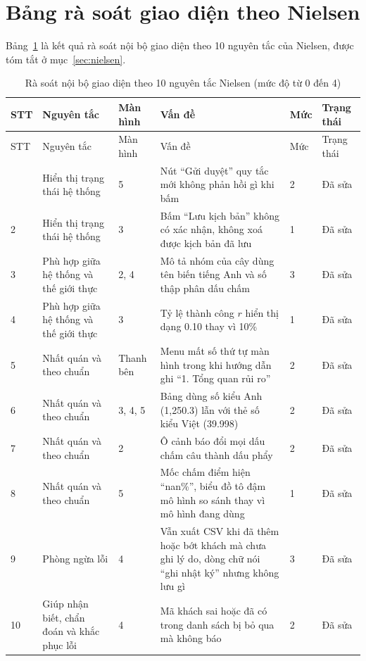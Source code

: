 \section{Bảng rà soát giao diện theo Nielsen}\label{sec:pl_nielsen}
Bảng~\ref{tab:nielsen} là kết quả rà soát nội bộ giao diện theo 10 nguyên tắc của Nielsen, được tóm tắt ở mục~\ref{sec:nielsen}.

{\footnotesize
\begin{longtable}{p{0.6cm}p{3.3cm}p{1.4cm}p{6.2cm}p{0.8cm}p{1.5cm}}
\caption{Rà soát nội bộ giao diện theo 10 nguyên tắc Nielsen (mức độ từ 0 đến 4)}\label{tab:nielsen}\\
\toprule
STT & Nguyên tắc & Màn hình & Vấn đề & Mức & Trạng thái \\
\midrule
\endfirsthead
\toprule
STT & Nguyên tắc & Màn hình & Vấn đề & Mức & Trạng thái \\
\midrule
\endhead
\bottomrule
\endlastfoot
1 & Hiển thị trạng thái hệ thống & 5 & Nút ``Gửi duyệt'' quy tắc mới không phản hồi gì khi bấm & 2 & Đã sửa \\
2 & Hiển thị trạng thái hệ thống & 3 & Bấm ``Lưu kịch bản'' không có xác nhận, không xoá được kịch bản đã lưu & 1 & Đã sửa \\
3 & Phù hợp giữa hệ thống và thế giới thực & 2, 4 & Mô tả nhóm của cây dùng tên biến tiếng Anh và số thập phân dấu chấm & 3 & Đã sửa \\
4 & Phù hợp giữa hệ thống và thế giới thực & 3 & Tỷ lệ thành công $r$ hiển thị dạng 0.10 thay vì 10\% & 1 & Đã sửa \\
5 & Nhất quán và theo chuẩn & Thanh bên & Menu mất số thứ tự màn hình trong khi hướng dẫn ghi ``1. Tổng quan rủi ro'' & 2 & Đã sửa \\
6 & Nhất quán và theo chuẩn & 3, 4, 5 & Bảng dùng số kiểu Anh (1,250.3) lẫn với thẻ số kiểu Việt (39.998) & 2 & Đã sửa \\
7 & Nhất quán và theo chuẩn & 2 & Ô cảnh báo đổi mọi dấu chấm câu thành dấu phẩy & 2 & Đã sửa \\
8 & Nhất quán và theo chuẩn & 5 & Mốc chấm điểm hiện ``nan\%'', biểu đồ tô đậm mô hình so sánh thay vì mô hình đang dùng & 1 & Đã sửa \\
9 & Phòng ngừa lỗi & 4 & Vẫn xuất CSV khi đã thêm hoặc bớt khách mà chưa ghi lý do, dòng chữ nói ``ghi nhật ký'' nhưng không lưu gì & 3 & Đã sửa \\
10 & Giúp nhận biết, chẩn đoán và khắc phục lỗi & 4 & Mã khách sai hoặc đã có trong danh sách bị bỏ qua mà không báo & 2 & Đã sửa \\

\end{longtable}}
